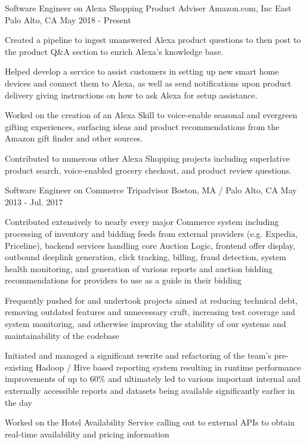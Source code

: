 
\begin{cventries}


\cventry
    {Software Engineer on Alexa Shopping Product Adviser} %
    {Amazon.com, Inc} %
    {East Palo Alto, CA} %
    {May 2018 - Present} %
    { %
        \begin{cvitems}
            \item{Created a pipeline to ingest unanswered Alexa product questions to then post to the product Q\&A section to enrich Alexa's knowledge base.}
            \item{Helped develop a service to assist customers in setting up new smart home devices and connect them to Alexa, as well as send notifications upon product delivery giving instructions on how to ask Alexa for setup assistance.}
            \item{Worked on the creation of an Alexa Skill to voice-enable seasonal and evergreen gifting experiences, surfacing ideas and product recommendations from the Amazon gift finder and other sources.}
            \item{Contributed to numerous other Alexa Shopping projects including superlative product search, voice-enabled grocery checkout, and product review questions.}
        \end{cvitems}
    }



\cventry
    {Software Engineer on Commerce} %
    {Tripadvisor} %
    {Boston, MA / Palo Alto, CA} %
    {May 2013 - Jul. 2017} %
    { %
        \begin{cvitems}
            \item{Contributed extensively to nearly every major Commerce system including processing of inventory and bidding feeds from external providers (e.g. Expedia, Priceline), backend services handling core Auction Logic, frontend offer display, outbound deeplink generation, click tracking, billing, fraud detection, system health monitoring, and generation of various reports and auction bidding recommendations for providers to use as a guide in their bidding}
            \item{Frequently pushed for and undertook projects aimed at reducing technical debt, removing outdated features and unnecessary cruft, increasing test coverage and system monitoring, and otherwise improving the stability of our systems and maintainability of the codebase}
            \item{Initiated and managed a significant rewrite and refactoring of the team's pre-existing Hadoop / Hive based reporting system resulting in runtime performance improvements of up to 60\% and ultimately led to various important internal and externally accessible reports and datasets being available significantly earlier in the day}
            \item{Worked on the Hotel Availability Service calling out to external APIs to obtain real-time availability and pricing information}
        \end{cvitems}
    }


\end{cventries}
